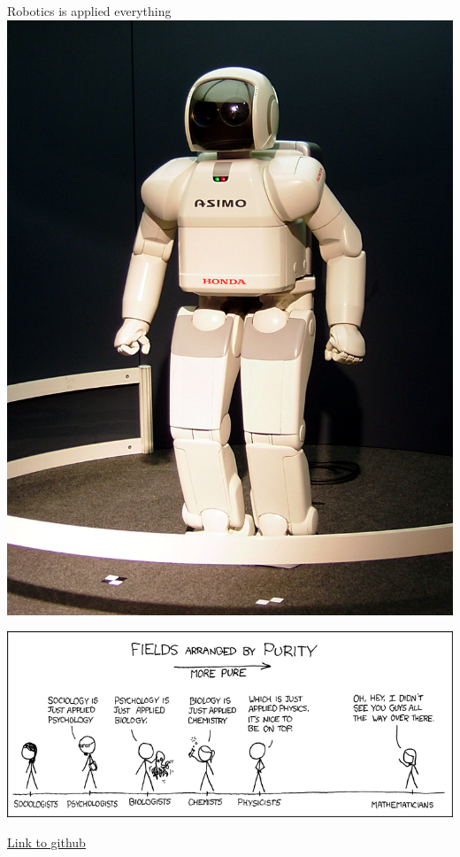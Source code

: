 \documentclass[times]{beamer}
\begin{document}
  \begin{frame}
    \begin{minipage}[b]{0.1\linewidth}\tiny{Robotics is applied everything}\\
      \includegraphics[width=\linewidth]{media/HONDA_ASIMO.jpg}\end{minipage}%
    \hspace{0.3\linewidth}\includegraphics[width=0.5\linewidth]{media/purity.png}
  \end{frame}
  \begin{frame}
    \href{https://github.com/wecacuee/ECE417-Mobile-Robots}{Link to github}
    \end{frame}
\end{document}
